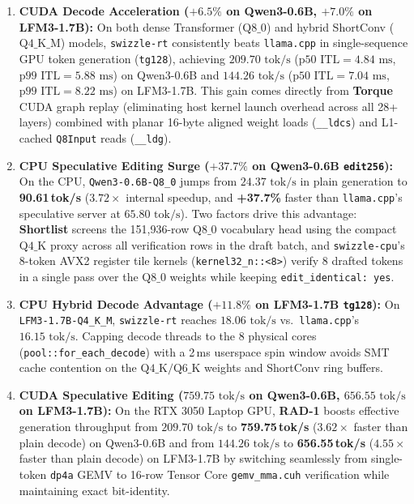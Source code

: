 \documentclass[10pt,a4paper]{article}
\theoremstyle{swzstyle}
\newcommand{\code}[1]{\texttt{#1}}
\begin{document}
\begin{enumerate}
  \item \textbf{CUDA Decode Acceleration ($+6.5\%$ on Qwen3-0.6B, $+7.0\%$ on LFM3-1.7B):} On both dense Transformer ($\text{Q8\_0}$) and hybrid ShortConv ($\text{Q4\_K\_M}$) models, \code{swizzle-rt} consistently beats \code{llama.cpp} in single-sequence GPU token generation (\code{tg128}), achieving $209.70\text{ tok/s}$ ($\text{p50 ITL} = 4.84\text{ ms}$, $\text{p99 ITL} = 5.88\text{ ms}$) on Qwen3-0.6B and $144.26\text{ tok/s}$ ($\text{p50 ITL} = 7.04\text{ ms}$, $\text{p99 ITL} = 8.22\text{ ms}$) on LFM3-1.7B. This gain comes directly from \textbf{Torque} CUDA graph replay (eliminating host kernel launch overhead across all 28+ layers) combined with planar 16-byte aligned weight loads (\code{\_\_ldcs}) and L1-cached \code{Q8Input} reads (\code{\_\_ldg}).
  \item \textbf{CPU Speculative Editing Surge ($+37.7\%$ on Qwen3-0.6B \texttt{edit256}):} On the CPU, \code{Qwen3-0.6B-Q8\_0} jumps from $24.37\text{ tok/s}$ in plain generation to \textbf{90.61\,tok/s} ($3.72\times$ internal speedup, and \textbf{+37.7\%} faster than \code{llama.cpp}'s speculative server at $65.80\text{ tok/s}$). Two factors drive this advantage: \textbf{Shortlist} screens the 151,936-row $\text{Q8\_0}$ vocabulary head using the compact $\text{Q4\_K}$ proxy across all verification rows in the draft batch, and \code{swizzle-cpu}'s 8-token AVX2 register tile kernels (\code{kernel32\_n::<8>}) verify 8 drafted tokens in a single pass over the $\text{Q8\_0}$ weights while keeping \code{edit\_identical: yes}.
  \item \textbf{CPU Hybrid Decode Advantage ($+11.8\%$ on LFM3-1.7B \texttt{tg128}):} On \code{LFM3-1.7B-Q4\_K\_M}, \code{swizzle-rt} reaches $18.06\text{ tok/s}$ vs.\ \code{llama.cpp}'s $16.15\text{ tok/s}$. Capping decode threads to the 8 physical cores (\code{pool::for\_each\_decode}) with a 2\,ms userspace spin window avoids SMT cache contention on the $\text{Q4\_K}/\text{Q6\_K}$ weights and ShortConv ring buffers.
  \item \textbf{CUDA Speculative Editing ($759.75\text{ tok/s}$ on Qwen3-0.6B, $656.55\text{ tok/s}$ on LFM3-1.7B):} On the RTX 3050 Laptop GPU, \textbf{RAD-1} boosts effective generation throughput from $209.70\text{ tok/s}$ to \textbf{759.75\,tok/s} ($3.62\times$ faster than plain decode) on Qwen3-0.6B and from $144.26\text{ tok/s}$ to \textbf{656.55\,tok/s} ($4.55\times$ faster than plain decode) on LFM3-1.7B by switching seamlessly from single-token \code{dp4a} GEMV to 16-row Tensor Core \code{gemv\_mma.cuh} verification while maintaining exact bit-identity.
\end{enumerate}
\end{document}

